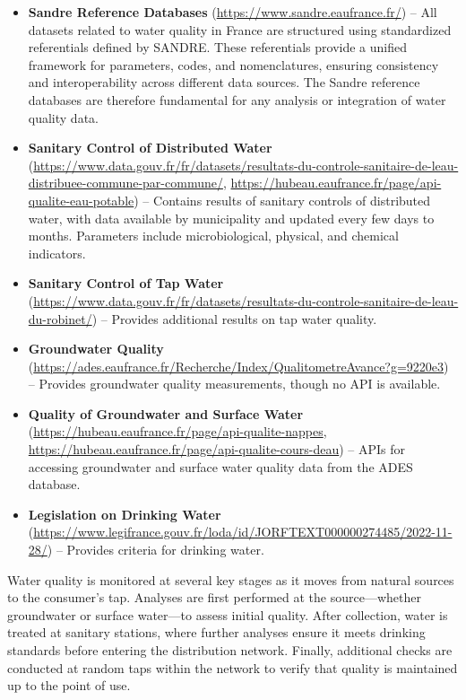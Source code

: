 \documentclass{article}
\begin{document}
\begin{itemize}
    \item \textbf{Sandre Reference Databases} (\url{https://www.sandre.eaufrance.fr/}) -- All datasets related to water quality in France are structured using standardized referentials defined by SANDRE. These referentials provide a unified framework for parameters, codes, and nomenclatures, ensuring consistency and interoperability across different data sources. The Sandre reference databases are therefore fundamental for any analysis or integration of water quality data.
    \item \textbf{Sanitary Control of Distributed Water} (\url{https://www.data.gouv.fr/fr/datasets/resultats-du-controle-sanitaire-de-leau-distribuee-commune-par-commune/}, \url{https://hubeau.eaufrance.fr/page/api-qualite-eau-potable}) -- Contains results of sanitary controls of distributed water, with data available by municipality and updated every few days to months. Parameters include microbiological, physical, and chemical indicators.
    \item \textbf{Sanitary Control of Tap Water} (\url{https://www.data.gouv.fr/fr/datasets/resultats-du-controle-sanitaire-de-leau-du-robinet/}) -- Provides additional results on tap water quality.
    \item \textbf{Groundwater Quality} (\url{https://ades.eaufrance.fr/Recherche/Index/QualitometreAvance?g=9220e3}) -- Provides groundwater quality measurements, though no API is available.
    \item \textbf{Quality of Groundwater and Surface Water} (\url{https://hubeau.eaufrance.fr/page/api-qualite-nappes}, \url{https://hubeau.eaufrance.fr/page/api-qualite-cours-deau}) -- APIs for accessing groundwater and surface water quality data from the ADES database.
    \item \textbf{Legislation on Drinking Water} (\url{https://www.legifrance.gouv.fr/loda/id/JORFTEXT000000274485/2022-11-28/}) -- Provides criteria for drinking water.
\end{itemize}

Water quality is monitored at several key stages as it moves from natural sources to the consumer's tap. Analyses are first performed at the source—whether groundwater or surface water—to assess initial quality. After collection, water is treated at sanitary stations, where further analyses ensure it meets drinking standards before entering the distribution network. Finally, additional checks are conducted at random taps within the network to verify that quality is maintained up to the point of use.
\end{document}
